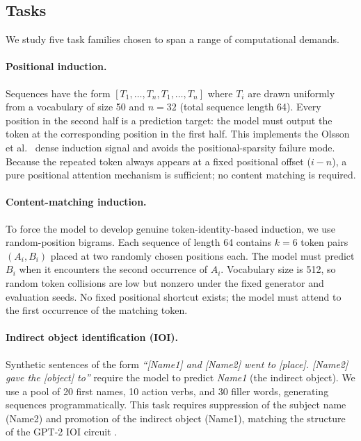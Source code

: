 \subsection{Tasks}
\label{sec:tasks}

We study five task families chosen to span a range of computational demands.

\paragraph{Positional induction.}
Sequences have the form $[T_1, \ldots, T_n, T_1, \ldots, T_n]$ where $T_i$ are drawn uniformly
from a vocabulary of size 50 and $n = 32$ (total sequence length 64). Every position in the
second half is a prediction target: the model must output the token at the corresponding position
in the first half. This implements the Olsson et al.\ \cite{olsson2022context} dense induction
signal and avoids the positional-sparsity failure mode. Because the repeated token always appears
at a fixed positional offset ($i - n$), a pure positional attention mechanism is sufficient;
no content matching is required.

\paragraph{Content-matching induction.}
To force the model to develop genuine token-identity-based induction, we use random-position
bigrams. Each sequence of length 64 contains $k = 6$ token pairs $(A_i, B_i)$ placed at two
randomly chosen positions each. The model must predict $B_i$ when it encounters the second
occurrence of $A_i$. Vocabulary size is 512, so random token collisions are low but nonzero
under the fixed generator and evaluation seeds. No fixed positional shortcut exists; the model
must attend to the first occurrence of the matching token.

\paragraph{Indirect object identification (IOI).}
Synthetic sentences of the form \textit{``[Name1] and [Name2] went to [place]. [Name2] gave the
[object] to''} require the model to predict \textit{Name1} (the indirect object). We use a
pool of 20 first names, 10 action verbs, and 30 filler words, generating sequences programmatically.
This task requires suppression of the subject name (Name2) and promotion of the indirect object
(Name1), matching the structure of the GPT-2 IOI circuit \cite{wang2022interpretability}.

